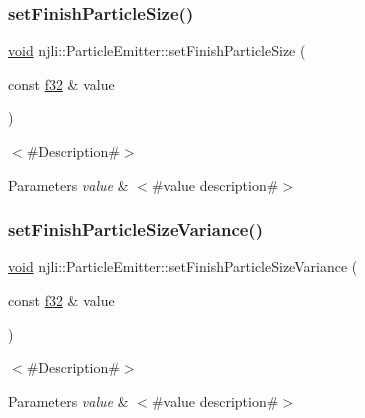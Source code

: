 \subsubsection{\texorpdfstring{set\+Finish\+Particle\+Size()}{setFinishParticleSize()}}
{\footnotesize\ttfamily \mbox{\hyperlink{_thread_8h_af1e856da2e658414cb2456cb6f7ebc66}{void}} njli\+::\+Particle\+Emitter\+::set\+Finish\+Particle\+Size (\begin{DoxyParamCaption}\item[{const \mbox{\hyperlink{_util_8h_a5f6906312a689f27d70e9d086649d3fd}{f32}} \&}]{value }\end{DoxyParamCaption})}

$<$\#\+Description\#$>$


\begin{DoxyParams}{Parameters}
{\em value} & $<$\#value description\#$>$ \\
\hline
\end{DoxyParams}
\mbox{\label{classnjli_1_1_particle_emitter_ad882ca8fc381b8e06adfe34ee0b41515}} 
\subsubsection{\texorpdfstring{set\+Finish\+Particle\+Size\+Variance()}{setFinishParticleSizeVariance()}}
{\footnotesize\ttfamily \mbox{\hyperlink{_thread_8h_af1e856da2e658414cb2456cb6f7ebc66}{void}} njli\+::\+Particle\+Emitter\+::set\+Finish\+Particle\+Size\+Variance (\begin{DoxyParamCaption}\item[{const \mbox{\hyperlink{_util_8h_a5f6906312a689f27d70e9d086649d3fd}{f32}} \&}]{value }\end{DoxyParamCaption})}

$<$\#\+Description\#$>$


\begin{DoxyParams}{Parameters}
{\em value} & $<$\#value description\#$>$ \\
\hline
\end{DoxyParams}
\mbox{\label{classnjli_1_1_particle_emitter_a88b3e1c1cac582fc31076c1a13663db8}} 

